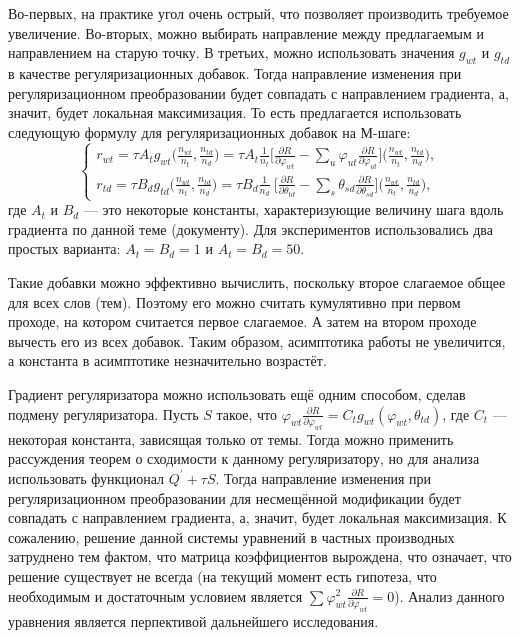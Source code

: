 \documentclass[12pt]{article}
\renewcommand{\phi}{\varphi}
\begin{document}
Во-первых, на практике угол очень острый, что позволяет производить требуемое увеличение. Во-вторых, можно выбирать направление между предлагаемым  и направлением на старую точку. В третьих, можно использовать значения $g_{wt}$ и $g_{td}$ в качестве регуляризационных добавок. Тогда направление изменения при регуляризационном преобразовании будет совпадать с направлением градиента, а, значит, будет локальная максимизация. То есть предлагается использовать следующую формулу для регуляризационных добавок на М-шаге:
\[
\left\{
	\begin{aligned}
		r_{wt} = \tau A_t g_{wt}\bigg(\frac{n_{wt}}{n_t}, \frac{n_{td}}{n_d}\bigg) = \tau A_t \frac{1}{n_t} \bigg[{\frac{\partial{R}}{\partial{\phi_{wt}}} - \sum\limits_u \phi_{ut} \frac{\partial{R}}{\partial{\phi_{ut}}} }\bigg] \bigg(\frac{n_{wt}}{n_t}, \frac{n_{td}}{n_d}\bigg),\\
		r_{td} = \tau B_d g_{td} \bigg(\frac{n_{wt}}{n_t}, \frac{n_{td}}{n_d}\bigg) = \tau B_d \frac{1}{n_d} \ \bigg[ {\frac{\partial{R}}{\partial{\theta_{td}}} - \sum\limits_s \theta_{sd} \frac{\partial{R}}{\partial{\theta_{sd}}} }\bigg] \bigg(\frac{n_{wt}}{n_t}, \frac{n_{td}}{n_d}\bigg) ,
	\end{aligned}
\right.
\]
где $A_t$ и $B_d$ --- это некоторые константы, характеризующие величину шага вдоль градиента по данной теме (документу). Для экспериментов использовались два простых варианта: $A_t = B_d = 1$ и $A_t=B_d=50$.

Такие добавки можно эффективно вычислить, поскольку второе слагаемое общее для всех слов (тем). Поэтому его можно считать кумулятивно при первом проходе, на котором считается первое слагаемое. А затем на втором проходе вычесть его из всех добавок. Таким образом, асимптотика работы не увеличится, а константа в асимптотике незначительно возрастёт.

Градиент регуляризатора можно использовать ещё одним способом, сделав подмену регуляризатора. Пусть $S$ такое, что $\phi_{wt}\frac{\partial{R}}{\partial{\phi_{wt}}} = C_t g_{wt}(\phi_{wt}, \theta_{td})$, где $C_t$ --- некоторая константа, зависящая только от темы. Тогда можно применить рассуждения теорем о сходимости к данному регуляризатору, но для анализа использовать функционал $Q^{\prime} + \tau S$. Тогда направление изменения при регуляризационном преобразовании для несмещённой модификации будет совпадать с направлением градиента, а, значит, будет локальная максимизация. К сожалению, решение данной системы уравнений в частных производных затруднено тем фактом, что матрица коэффициентов вырождена, что означает, что решение существует не всегда (на текущий момент есть гипотеза, что необходимым и достаточным условием является $\sum \phi_{wt}^2 \frac{\partial{R}}{\partial{\phi_{wt}}} = 0$). Анализ данного уравнения является перпективой дальнейшего исследования.
\end{document}
